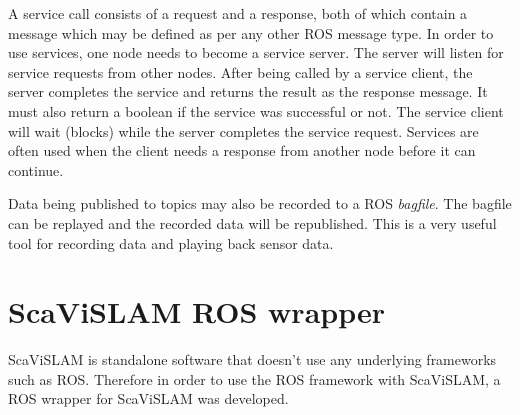 A service call consists of a request and a response, both of which contain a message which may be defined as per any other ROS message type.  In order to use services, one node needs to become a service server.  The server will listen for service requests from other nodes.  After being called by a service client, the server completes the service and returns the result as the response message.  It must also return a boolean if the service was successful or not.  The service client will wait (blocks) while the server completes the service request.  Services are often used when the client needs a response from another node before it can continue.

Data being published to topics may also be recorded to a ROS \textit{bagfile}.  The bagfile can be replayed and the recorded data will be republished. This is a very useful tool for recording data and playing back sensor data.
 
\section{ScaViSLAM ROS wrapper}

ScaViSLAM is standalone software that doesn't use any underlying frameworks such as ROS.  Therefore in order to use the ROS framework with ScaViSLAM, a ROS wrapper for ScaViSLAM was developed. 

